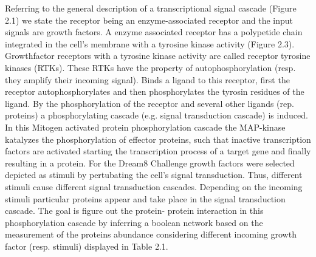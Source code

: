 Referring to the general description of a transcriptional signal cascade (Figure 2.1) we state the receptor being an enzyme-associated receptor and the input signals are growth factors. A enzyme associated receptor has a polypetide chain integrated in the cell's membrane with a tyrosine kinase activity (Figure 2.3). Growthfactor receptors with a tyrosine kinase activity are called receptor tyrosine kinases (\gls{RTK}s). These RTKs have the property of autophosphorylation (resp. they amplify their incoming signal). Binds a ligand to this receptor, first the receptor autophosphorylates and then phosphorylates the tyrosin residues of the ligand. By the phosphorylation of the receptor and several other ligands (rep. proteins) a phosphorylating cascade (e.g. signal transduction cascade) is induced. In this Mitogen activated protein phosphorylation cascade the MAP-kinase katalyzes the phosphorylation of effector proteins, such that inactive transcription factors are activated starting the transcription process of a target gene and finally resulting in a protein.
For the Dream8 Challenge growth factors were selected depicted as stimuli by pertubating the cell's signal transduction. Thus, different stimuli cause different signal transduction cascades. Depending on the incoming stimuli particular proteins appear and take place in the signal transduction cascade. The goal is figure out the protein- protein interaction in this  phosphorylation cascade by inferring a boolean network based on the measurement of the proteins abundance considering different incoming growth factor (resp. stimuli) displayed in Table 2.1.


